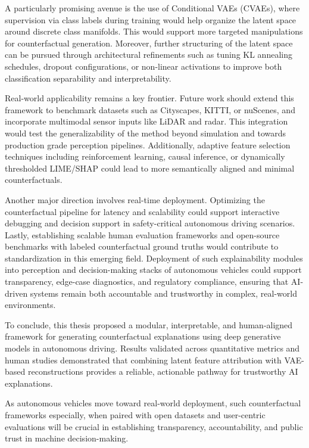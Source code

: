 A particularly promising avenue is the use of Conditional VAEs (CVAEs), where supervision via class labels during training would help organize the latent space around discrete class manifolds. This would support more targeted manipulations for counterfactual generation. Moreover, further structuring of the latent space can be pursued through architectural refinements such as tuning KL annealing schedules, dropout configurations, or non-linear activations to improve both classification separability and interpretability.

Real-world applicability remains a key frontier. Future work should extend this framework to benchmark datasets such as Cityscapes, KITTI, or nuScenes, and incorporate multimodal sensor inputs like LiDAR and radar. This integration would test the generalizability of the method beyond simulation and towards production grade perception pipelines. Additionally, adaptive feature selection techniques including reinforcement learning, causal inference, or dynamically thresholded LIME/SHAP could lead to more semantically aligned and minimal counterfactuals.

Another major direction involves real-time deployment. Optimizing the counterfactual pipeline for latency and scalability could support interactive debugging and decision support in safety-critical autonomous driving scenarios. Lastly, establishing scalable human evaluation frameworks and open-source benchmarks with labeled counterfactual ground truths would contribute to standardization in this emerging field. Deployment of such explainability modules into perception and decision-making stacks of autonomous vehicles could support transparency, edge-case diagnostics, and regulatory compliance, ensuring that AI-driven systems remain both accountable and trustworthy in complex, real-world environments.



To conclude, this thesis proposed a modular, interpretable, and human-aligned framework for generating counterfactual explanations using deep generative models in autonomous driving. Results validated across quantitative metrics and human studies demonstrated that combining latent feature attribution with VAE-based reconstructions provides a reliable, actionable pathway for trustworthy AI explanations.

As autonomous vehicles move toward real-world deployment, such counterfactual frameworks especially, when paired with open datasets and user-centric evaluations will be crucial in establishing transparency, accountability, and public trust in machine decision-making.